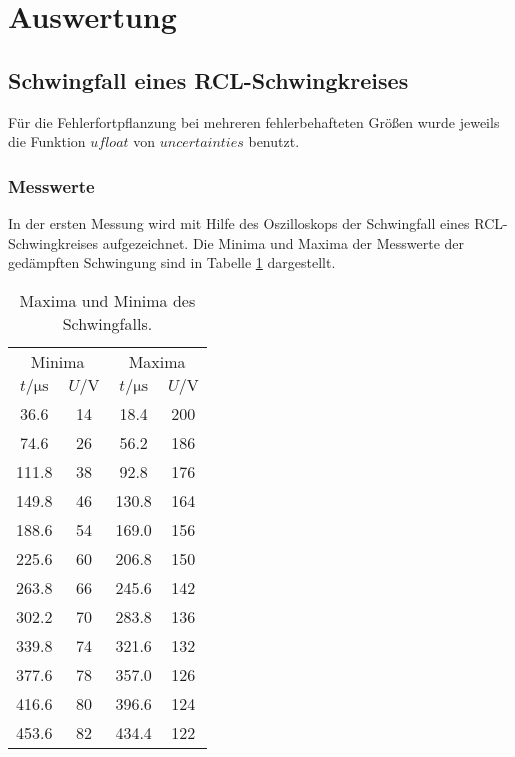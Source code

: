 \newpage
\section{Auswertung}
\label{sec:Auswertung}

\subsection{Schwingfall eines RCL-Schwingkreises}

Für die Fehlerfortpflanzung bei mehreren fehlerbehafteten Größen wurde jeweils
die Funktion $ufloat$ von $uncertainties$ benutzt.

\subsubsection{Messwerte}

In der ersten Messung wird mit Hilfe des Oszilloskops der Schwingfall eines
RCL-Schwingkreises aufgezeichnet. Die Minima und Maxima der Messwerte der
gedämpften Schwingung sind in Tabelle \ref{tab:Schwingfall} dargestellt.

\begin{table}[h]
  \centering
  \begin{tabular}{c c c c}
    \toprule
    \multicolumn{2}{c}{Minima} & \multicolumn{2}{c}{Maxima} \\
    $t/\si{\micro\second}$ & $U/\si{\V}$
    & $t/\si{\micro\second}$ & $U/\si{\V}$  \\
    \midrule
    36.6 & 14 & 18.4 & 200 \\
    74.6 & 26 & 56.2 & 186 \\
    111.8 & 38 & 92.8 & 176 \\
    149.8 & 46 & 130.8 & 164 \\
    188.6 & 54 & 169.0 & 156 \\
    225.6 & 60 & 206.8 & 150 \\
    263.8 & 66 & 245.6 & 142 \\
    302.2 & 70 & 283.8 & 136 \\
    339.8 & 74 & 321.6 & 132 \\
    377.6 & 78 & 357.0 & 126 \\
    416.6 & 80 & 396.6 & 124 \\
    453.6 & 82 & 434.4 & 122 \\
    \bottomrule
  \end{tabular}
  \caption{Maxima und Minima des Schwingfalls.}
  \label{tab:Schwingfall}
\end{table}

